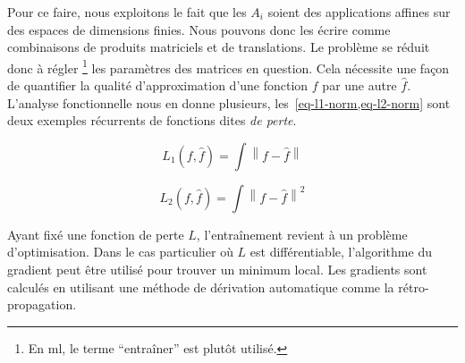 Pour ce faire, nous exploitons le fait que 
les \(A_i\) soient des applications affines sur des espaces de dimensions finies.
Nous pouvons donc les écrire comme combinaisons de produits matriciels et de translations.
Le problème se réduit donc à régler \footnote{En \gls{ml}, le terme ``entraîner'' est plutôt utilisé.}
les paramètres des matrices en question. 
Cela nécessite une façon de quantifier la qualité d'approximation d'une fonction \(f\) par une autre \(\hat{f}\).
L'analyse fonctionnelle nous en donne plusieurs, les~\cref{eq-l1-norm,eq-l2-norm}
sont deux exemples récurrents de fonctions dites \emph{de perte}.

\begin{equation}
    \label{eq-l1-norm}
    L_1(f, \hat{f}) = \int \left\|f - \hat{f}\right\|
\end{equation}

\begin{equation}
    \label{eq-l2-norm}
    L_2(f, \hat{f}) = \int \left\|f - \hat{f}\right\|^2
\end{equation}

Ayant fixé une fonction de perte \(L\), l'entraînement revient à un problème d'optimisation.
Dans le cas particulier où \(L\) est différentiable, 
l'algorithme du gradient peut être utilisé pour trouver un minimum local.
Les gradients sont calculés en utilisant une méthode de dérivation automatique comme la rétro-propagation.
